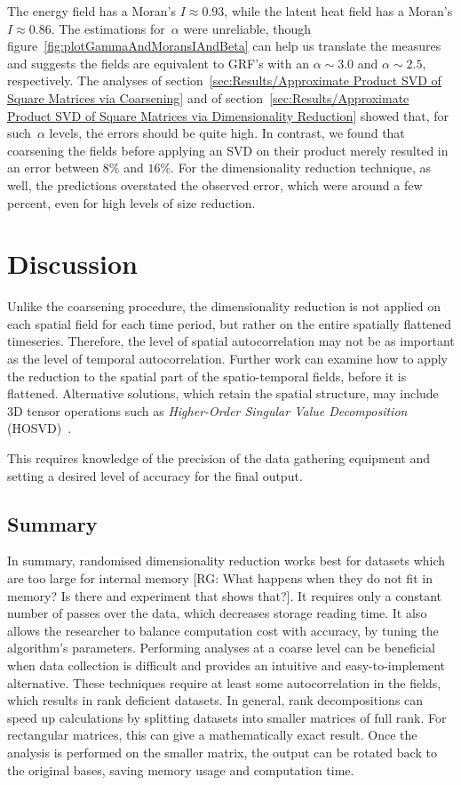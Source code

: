 \documentclass[ijgi,article,submit,moreauthors,pdftex,10pt,a4paper]{Definitions/mdpi}
\begin{document}
The energy field has a Moran's $I \approx 0.93$, while the latent heat field has a Moran's $I \approx 0.86$. The estimations for~$\alpha$ were unreliable, though figure~\ref{fig:plotGammaAndMoransIAndBeta} can help us translate the measures and suggests the fields are equivalent to GRF's with an $\alpha \sim 3.0$ and $\alpha \sim 2.5$, respectively. The analyses of section~\ref{sec:Results/Approximate Product SVD of Square Matrices via Coarsening} and of section~\ref{sec:Results/Approximate Product SVD of Square Matrices via Dimensionality Reduction} showed that, for such~$\alpha$ levels, the errors should be quite high. In contrast, we found that coarsening the fields before applying an SVD on their product merely resulted in an error between $8\%$ and $16\%$. For the dimensionality reduction technique, as well, the predictions overstated the observed error, which were around a few percent, even for high levels of size reduction. 


\section{Discussion}


Unlike the coarsening procedure, the dimensionality reduction is not applied on each spatial field for each time period, but rather on the entire spatially flattened timeseries. Therefore, the level of spatial autocorrelation may not be as important as the level of temporal autocorrelation. Further work can examine how to apply the reduction to the spatial part of the spatio-temporal fields, before it is flattened. Alternative solutions, which retain the spatial structure, may include 3D tensor operations such as \textit{Higher-Order Singular Value Decomposition} (HOSVD)~\cite{Tucker1964}.

This requires knowledge of the precision of the data gathering equipment and setting a desired level of accuracy for the final output.
\subsection{Summary}
\label{sec:Discussion/Summary}

In summary, randomised dimensionality reduction works best for datasets which are too large for internal memory [RG: What happens when they do not fit in memory? Is there and experiment that shows that?]. It requires only a constant number of passes over the data, which decreases storage reading time. It also allows the researcher to balance computation cost with accuracy, by tuning the algorithm's parameters. Performing analyses at a coarse level can be beneficial when data collection is difficult and provides an intuitive and easy-to-implement alternative. These techniques require at least some autocorrelation in the fields, which results in rank deficient datasets. In general, rank decompositions can speed up calculations by splitting datasets into smaller matrices of full rank. For rectangular matrices, this can give a mathematically exact result. Once the analysis is performed on the smaller matrix, the output can be rotated back to the original bases, saving memory usage and computation time.
\\
\end{document}
